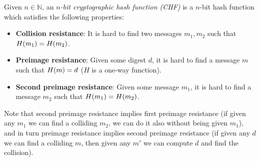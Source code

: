 \begin{definition}
	Given \(n \in \mathbb{N}\), an \emph{\(n\)-bit cryptographic hash function (CHF)} is a \(n\)-bit 
  hash function which satisfies the following properties:
	\begin{itemize}
		\item \textbf{Collision resistance}: It is hard to find two messages \(m_1, m_2\) such
		      that \(\call{H}{m_1} = \call{H}{m_2}\).
		\item \textbf{Preimage resistance}: Given some digest \(d\), it is hard to find a
		      message \(m\) such that \(\call{H}{m} = d\) (\(H\) is a one-way function).
		\item \textbf{Second preimage resistance}: Given some message \(m_1\), it is hard to
		      find a message \(m_2\) such that \(\call{H}{m_1} = \call{H}{m_2}\).
	\end{itemize}
\end{definition}

Note that second preimage resistance implies first preimage resistance (if given any \(m_1\) 
we can find a colliding \(m_2\), we can do it also without being given \(m_1\)), and in turn 
preimage resistance implies second preimage resistance (if given any \(d\) we can find a colliding 
\(m\), then given any \(m'\) we can compute \(d\) and find the collision).

